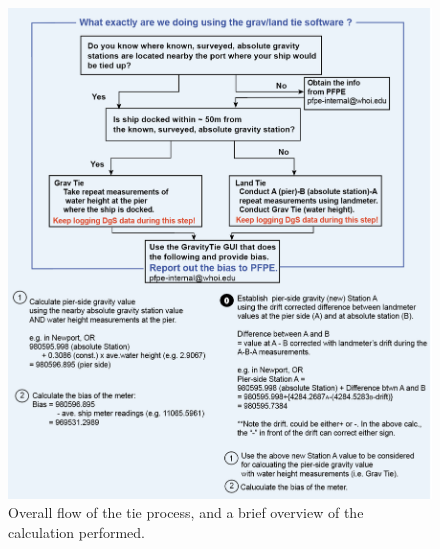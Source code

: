 \documentclass{pfpe-manual}
\begin{document}
\begin{figure}[ht!]
\centering
\includegraphics[width=\textwidth]{figs/flowchart.png}
\caption{Overall flow of the tie process, and a brief overview of the calculation performed.}
\label{flowchart}
\end{figure}
\end{document}

